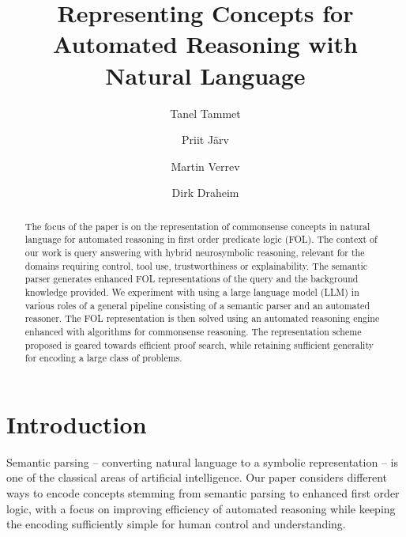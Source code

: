 \documentclass[runningheads]{llncs}
\begin{document}
\title{Representing Concepts for Automated Reasoning with Natural Language}

\author{Tanel Tammet \and
Priit J\"arv \and
Martin Verrev \and
Dirk Draheim
}
%

\maketitle


\begin{abstract}
The focus of the paper is on the representation of commonsense
concepts in natural language for automated reasoning in first order predicate logic (FOL).
The context of our work is query answering with hybrid neurosymbolic reasoning,
relevant for the domains requiring control, tool use, trustworthiness or explainability. 
The semantic parser generates enhanced FOL
representations of the query and the background knowledge provided.
We experiment with using a large language model (LLM) in various roles of a general
pipeline consisting of a semantic parser and an automated reasoner. 
The FOL representation is then solved using an automated reasoning engine
enhanced with algorithms for commonsense reasoning. The representation
scheme proposed is geared towards efficient proof search, while retaining
sufficient generality for encoding a large class of problems.
\end{abstract}

\section{Introduction}

Semantic parsing -- converting natural language to a symbolic representation -- 
is one of the classical areas of artificial intelligence. Our paper considers
different ways to encode concepts stemming from semantic parsing to enhanced
first order logic, with a focus on improving efficiency of automated reasoning 
while keeping the encoding sufficiently simple for human control and understanding.
\end{document}
